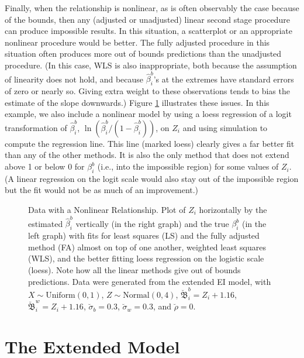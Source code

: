 \documentclass[11pt,titlepage]{article}
\newcommand{\bbeta}{{\mathfrak B}}
\newcommand{\sigmau}{\breve{\sigma}}
\newcommand{\rhou}{\breve{\rho}}
\begin{document}
Finally, when the relationship is nonlinear, as is often observably
the case because of the bounds, then any (adjusted or unadjusted)
linear second stage procedure can produce impossible results.  In this
situation, a scatterplot or an appropriate nonlinear procedure would
be better.  The fully adjusted procedure in this situation often
produces more out of bounds predictions than the unadjusted procedure.
(In this case, WLS is also inappropriate, both because the assumption
of linearity does not hold, and because $\hat\beta_i^b$'s at the
extremes have standard errors of zero or nearly so.  Giving extra
weight to these observations tends to bias the estimate of the slope
downwards.)  Figure \ref{f:nonlinear} illustrates these issues.  In
this example, we also include a nonlinear model by using a loess
regression of a logit transformation of $\hat\beta_i^b$,
$\ln(\hat\beta_i^b/(1-\hat\beta_i^b))$, on $Z_i$ and using simulation
to compute the regression line.  This line (marked loess) clearly
gives a far better fit than any of the other methods.  It is also the
only method that does not extend above 1 or below 0 for $\beta_i^b$
(i.e., into the impossible region) for some values of $Z_i$.  (A
linear regression on the logit scale would also stay out of the
impossible region but the fit would not be as much of an improvement.)
\begin{figure}[t]
  \begin{center}
    \caption{Data with a Nonlinear Relationship.  Plot of $Z_i$ 
      horizontally by the estimated $\hat\beta_i^b$ vertically (in the
      right graph) and the true $\beta_i^b$ (in the left graph) with
      fits for least squares (LS) and the fully adjusted method (FA)
      almost on top of one another, weighted least squares (WLS), and
      the better fitting loess regression on the logistic scale
      (loess).  Note how all the linear methods give out of bounds
      predictions.  Data were generated from the extended EI model,
      with $X \sim \textrm{Uniform}(0,1)$, $Z \sim
      \textrm{Normal}(0,4)$, $\breve\bbeta_i^b = Z_i + 1.16$,
      $\breve\bbeta_i^w = Z_i + 1.16$, $\sigmau_b = 0.3$, $\sigmau_w =
      0.3$, and $\rhou = 0$.}
    \label{f:nonlinear}
  \end{center}
\end{figure}

\section{The Extended Model} \label{s:exten}
\end{document}
